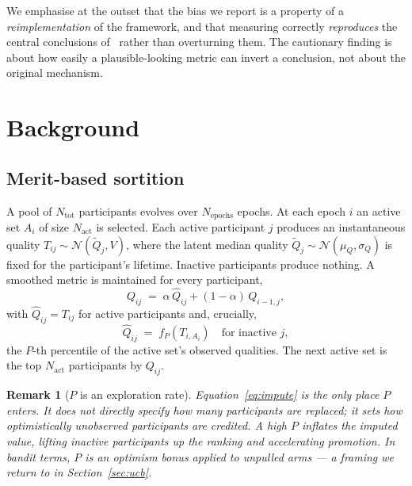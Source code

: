 \documentclass[10pt,twocolumn]{article}
\newtheorem{remark}{Remark}
\begin{document}
We emphasise at the outset that the bias we report is a property of a
\emph{reimplementation} of the framework, and that measuring correctly
\emph{reproduces} the central conclusions of~\cite{kruijssen2024} rather than
overturning them. The cautionary finding is about how easily a plausible-looking
metric can invert a conclusion, not about the original mechanism.

\section{Background}

\subsection{Merit-based sortition}
A pool of $N_{\mathrm{tot}}$ participants evolves over $N_{\mathrm{epochs}}$ epochs.
At each epoch $i$ an active set $A_i$ of size $N_{\mathrm{act}}$ is selected. Each
active participant $j$ produces an instantaneous quality
$T_{ij}\sim\mathcal{N}(\tilde Q_j, V)$, where the latent median quality
$\tilde Q_j\sim\mathcal{N}(\mu_Q,\sigma_Q)$ is fixed for the participant's lifetime.
Inactive participants produce nothing. A smoothed metric is maintained for every
participant,
\begin{equation}
Q_{ij} \;=\; \alpha\,\hat Q_{ij} + (1-\alpha)\,Q_{i-1,j},
\end{equation}
with $\hat Q_{ij}=T_{ij}$ for active participants and, crucially,
\begin{equation}\label{eq:impute}
\hat Q_{ij} \;=\; f_P\!\left(T_{i,A_i}\right)
\quad\text{for inactive } j,
\end{equation}
the $P$-th percentile of the active set's observed qualities. The next active set is
the top $N_{\mathrm{act}}$ participants by $Q_{ij}$.

\begin{remark}[$P$ is an exploration rate]\label{rem:explore}
Equation~\eqref{eq:impute} is the only place $P$ enters. It does not directly specify
how many participants are replaced; it sets how \emph{optimistically} unobserved
participants are credited. A high $P$ inflates the imputed value, lifting inactive
participants up the ranking and accelerating promotion. In bandit terms, $P$ is an
optimism bonus applied to unpulled arms --- a framing we return to in
Section~\ref{sec:ucb}.
\end{remark}
\end{document}
